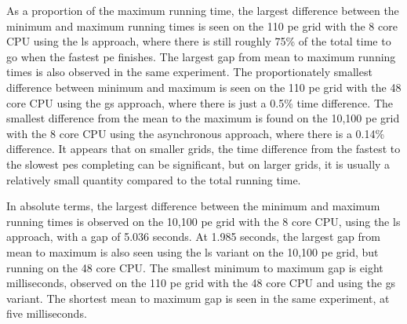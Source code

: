 As a proportion of the maximum running time, the largest difference between the minimum and maximum running times is seen on the 110 \gls{pe} grid with the 8 core CPU using the \gls{ls} approach, where there is still roughly 75\% of the total time to go when the fastest \gls{pe} finishes.  The largest gap from mean to maximum running times is also observed in the same experiment.  The proportionately smallest difference between minimum and maximum is seen on the 110 \gls{pe} grid with the 48 core CPU using the \gls{gs} approach, where there is just a 0.5\% time difference.  The smallest difference from the mean to the maximum is found on the 10,100 \gls{pe} grid with the 8 core CPU using the asynchronous approach, where there is a 0.14\% difference.  It appears that on smaller grids, the time difference from the fastest to the slowest \glspl{pe} completing can be significant, but on larger grids, it is usually a relatively small quantity compared to the total running time.

In absolute terms, the largest difference between the minimum and maximum running times is observed on the 10,100 \gls{pe} grid with the 8 core CPU, using the \gls{ls} approach, with a gap of 5.036 seconds.  At 1.985 seconds, the largest gap from mean to maximum is also seen using the \gls{ls} variant on the 10,100 \gls{pe} grid, but running on the 48 core CPU.  The smallest minimum to maximum gap is eight milliseconds, observed on the 110 \gls{pe} grid with the 48 core CPU and using the \gls{gs} variant.  The shortest mean to maximum gap is seen in the same experiment, at five milliseconds.

